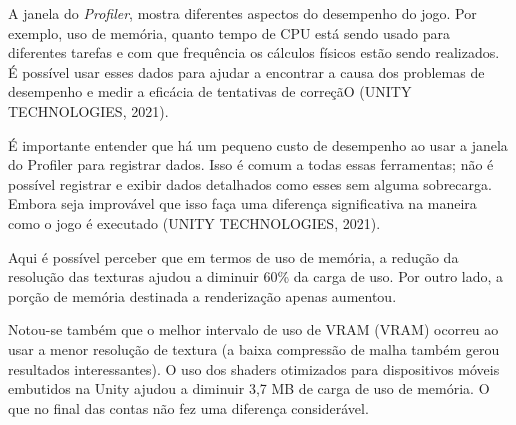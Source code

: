 A janela do \textit{Profiler}, mostra diferentes aspectos do desempenho do jogo. Por exemplo, uso de memória, quanto tempo de CPU está sendo usado para diferentes tarefas e com que frequência os cálculos físicos estão sendo realizados. É possível usar esses dados para ajudar a encontrar a causa dos problemas de desempenho e medir a eficácia de tentativas de correçãO (UNITY TECHNOLOGIES, 2021).

É importante entender que há um pequeno custo de desempenho ao usar a janela do Profiler para registrar dados. Isso é comum a todas essas ferramentas; não é possível registrar e exibir dados detalhados como esses sem alguma sobrecarga. Embora seja improvável que isso faça uma diferença significativa na maneira como o jogo é executado (UNITY TECHNOLOGIES, 2021).



Aqui é possível perceber que em termos de uso de memória, a redução da resolução das texturas ajudou a diminuir 60\% da carga de uso. Por outro lado, a porção de memória destinada a renderização apenas aumentou.

Notou-se também que o melhor intervalo de uso de VRAM (\acrlong{VRAM}) ocorreu ao usar a menor resolução de textura (a baixa compressão de malha também gerou resultados interessantes). O uso dos shaders otimizados para dispositivos móveis embutidos na Unity ajudou a diminuir 3,7 MB de carga de uso de memória. O que no final das contas não fez uma diferença considerável.
